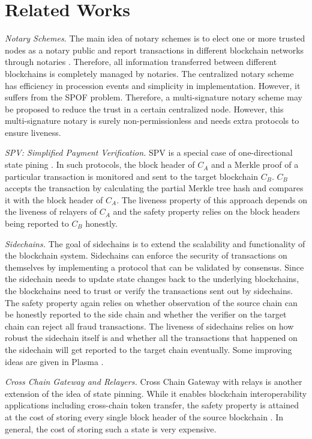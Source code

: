 \section{Related Works}
\label{chp:related-work}
\noindent
\emph{Notary Schemes.} The main idea of notary schemes is to elect one or more trusted nodes as a notary public and report transactions in different blockchain networks through notaries \cite{qin2018overview}. Therefore, all information transferred between different blockchains is completely managed by notaries. The centralized notary scheme has efficiency in procession events and simplicity in implementation. However, it suffers from the SPOF problem. Therefore, a multi-signature notary scheme may be proposed to reduce the trust in a certain centralized node. However, this multi-signature notary is surely non-permissionless and needs extra protocols to ensure liveness.

\smallskip\noindent\emph{SPV: Simplified Payment Verification.}
SPV \cite{lin2017survey,ray2020blwn} is a special case of one-directional state pining \cite{robinson2020merits}. In such protocols, the block header of $C_A$ and a Merkle proof of a particular transaction is monitored and sent to the target blockchain $C_B$. $C_B$ accepts the transaction by calculating the partial Merkle tree hash and compares it with the block header of $C_A$. The liveness property of this approach depends on the liveness of relayers of $C_A$ and the safety property relies on the block headers being reported to $C_B$ honestly. 
    
\smallskip\noindent\emph{Sidechains.}
The goal of sidechains \cite{singh2020sidechain} is to extend the scalability and functionality of the blockchain system. Sidechains can enforce the security of transactions on themselves by implementing a protocol that can be validated by consensus. Since the sidechain needs to update state changes back to the underlying blockchains, the blockchains need to trust or verify the transactions sent out by sidechains. The safety property again relies on whether observation of the source chain can be honestly reported to the side chain and whether the verifier on the target chain can reject all fraud transactions. The liveness of sidechains relies on how robust the sidechain itself is and whether all the transactions that happened on the sidechain will get reported to the target chain eventually. Some improving ideas are given in Plasma \cite{poon2017plasma}.

\smallskip\noindent\emph{Cross Chain Gateway and Relayers.}
Cross Chain Gateway with relays is another extension of the idea of state pinning. While it enables blockchain interoperability applications including cross-chain token transfer, the safety property is attained at the cost of storing every single block header of the source blockchain \cite{belchior2021survey}. In general, the cost of storing such a state is very expensive.

